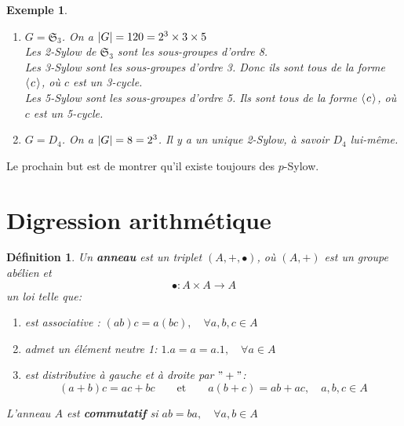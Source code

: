 \documentclass[a4paper, oneside]{report}
\theoremstyle{break}
\newtheorem{definition}[thm]{Définition}
\newtheorem{exemple}[thm]{Exemple}
\newcommand{\sg}{sous-groupe }
\newcommand{\x}{\times}
\renewcommand{\S}{\mathfrak{S}}
\DeclarePairedDelimiter\abs{\lvert}{\rvert}%
\newcommand{\pro}[1]{\langle\hspace{0.1em}#1\hspace{0.1em}\rangle}
\newcommand{\slign}{\textbf}
\begin{document}
\begin{exemple}
\begin{enumerate}
\begin{itemize}
\item les deux 4-cycles : $\sigma$ et 
\begin{align*}
\sigma^{-1} &= (a \; b \; c \; d)
\\
&= (a \; c) \sigma (a \; c)^{-1}
\\
&= (b \; d) \sigma (b \; d)^{-1}
\end{align*}
\end{itemize}
Notons que $P$ n'est pas distingué dans $\S_4$.\\
Les 3-Sylow de $\mathfrak{S}_4$ sont les sous-groupes d'ordre 3.\\
Ils sont tous de la forme $\pro{c}$, où $c$ est un 3-cycle (exercice : compléter le nombre de 3-cycles et le nombre de \sg d'ordre 3). Ils sont tous conjugués.\\

\item $G = \mathfrak{S}_3$. On a $\abs{G} = 120 = 2^3 \x 3 \x 5$\\
Les 2-Sylow de $\mathfrak{S}_3$ sont les sous-groupes d'ordre 8.\\
Les 3-Sylow sont les sous-groupes d'ordre 3. Donc ils sont tous de la forme $\pro{c}$, où $c$ est un 3-cycle.\\
Les 5-Sylow sont les sous-groupes d'ordre 5. Ils sont tous de la forme $\pro{c}$, où $c$ est un 5-cycle.\\
\item $G = D_4$. On a $\abs{G} = 8 = 2^3$. Il y a un unique 2-Sylow, à savoir $D_4$ lui-même.
\end{enumerate}
\end{exemple}
Le prochain but est de montrer qu'il existe toujours des $p$-Sylow.

\section{Digression arithmétique}

\begin{definition}
Un \slign{anneau} est un triplet $(A, +, \bullet)$, où $(A, +)$ est un groupe abélien et
\[
\bullet : A \times A \longrightarrow A
\]
un loi telle que:
\begin{enumerate}
\item est associative :	\quad	$(ab)c = a(bc),	\quad	\forall a, b, c \in A$
\item admet un élément neutre 1:	\quad	$1.a = a = a.1,	\quad	\forall a \in A$
\item est distributive à gauche et à droite par $"+"$:
\[
(a + b) c = ac + bc		\qquad	\text{et}	\qquad	a(b + c) = ab + ac, \quad	a, b, c \in A
\]
\end{enumerate}
L'anneau $A$ est \slign{commutatif} si $ab = ba,	\quad	\forall a, b \in A$
\end{definition}
\end{document}
